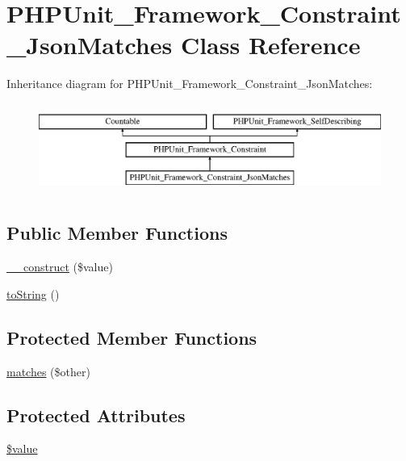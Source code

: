 \hypertarget{class_p_h_p_unit___framework___constraint___json_matches}{}\section{P\+H\+P\+Unit\+\_\+\+Framework\+\_\+\+Constraint\+\_\+\+Json\+Matches Class Reference}
\label{class_p_h_p_unit___framework___constraint___json_matches}
Inheritance diagram for P\+H\+P\+Unit\+\_\+\+Framework\+\_\+\+Constraint\+\_\+\+Json\+Matches\+:\begin{figure}[H]
\begin{center}
\leavevmode
\includegraphics[height=2.978723cm]{class_p_h_p_unit___framework___constraint___json_matches}
\end{center}
\end{figure}
\subsection*{Public Member Functions}
\begin{DoxyCompactItemize}
\item 
\mbox{\hyperlink{class_p_h_p_unit___framework___constraint___json_matches_a7e17a19b592345a03763f050fffe0ce7}{\+\_\+\+\_\+construct}} (\$value)
\item 
\mbox{\hyperlink{class_p_h_p_unit___framework___constraint___json_matches_a5558c5d549f41597377fa1ea8a1cefa3}{to\+String}} ()
\end{DoxyCompactItemize}
\subsection*{Protected Member Functions}
\begin{DoxyCompactItemize}
\item 
\mbox{\hyperlink{class_p_h_p_unit___framework___constraint___json_matches_a9c9c337de483bbdbb9fa249a6c7c9cc5}{matches}} (\$other)
\end{DoxyCompactItemize}
\subsection*{Protected Attributes}
\begin{DoxyCompactItemize}
\item 
\mbox{\hyperlink{class_p_h_p_unit___framework___constraint___json_matches_a0f298096f322952a72a50f98a74c7b60}{\$value}}
\end{DoxyCompactItemize}


